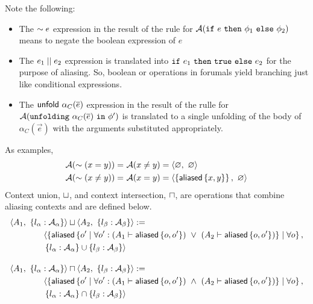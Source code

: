 %
Note the following:
\begin{itemize}
  \item The $\sim e$ expression in the result of the rule for $\mathcal{A}(\texttt{if} \ e \ \texttt{then} \ \phi_1 \ \texttt{else} \ \phi_2)$ means to negate the boolean expression of $e$
  \item The $e_1 \mid\mid e_2$ expression is translated into $\texttt{if} \ e_1 \ \texttt{then} \ \texttt{true} \ \texttt{else} \ e_2$ for the purpose of aliasing. So, boolean or operations in forumals yield branching just like conditional expressions.
  \item The $\textsf{unfold} \ \alpha_C(\overline{e})$ expression in the result of the rulle for $\mathcal{A}(\texttt{unfolding} \ \alpha_C(\overline{e}) \ \texttt{in} \ \phi^\prime)$ is translated to a single unfolding of the body of $\alpha_C(\vec{e})$ with the arguments substituted appropriately.
\end{itemize}
As examples,
\begin{align*}
  \mathcal{A}( \sim (x =   y) ) = & \ \mathcal{A}(x \neq y) = \langle \varnothing ,\ \varnothing \rangle \\
  \mathcal{A}( \sim (x\neq y) ) = & \ \mathcal{A}(x =    y) = \langle \left\{  \textsf{aliased}\left\{ x,y \right\}  \right\} ,\ \varnothing \rangle
\end{align*}
Context union, $\sqcup$, and context intersection, $\sqcap$, are operations that combine aliasing contexts and are defined below.
%
\begin{align*}
&
\context{A_1}{\set{ l_\alpha : \A_\alpha }} \contextunion
\context{A_2}{\set{ l_\beta : \A_\beta }} :=
\\ & \hspace{4em}
\langle
  \set{
    \aliased\set{
      o\p
      \mid
      \forall o\p :
      (A_1 \entails \aliased\set{o, o\p}) \ \lor \
      (A_2 \entails \aliased\set{o, o\p}) }
    \mid
    \forall o
  },
\\ & \hspace{4em}
  \set{ l_\alpha : \A_\alpha } \cup \set{ l_\beta : \A_\beta }
\rangle
%
\\[1em]
%
&
\context{A_1}{\set{ l_\alpha : \A_\alpha }} \contextintersection
\context{A_2}{\set{ l_\beta : \A_\beta }} :=
\\ & \hspace{4em}
\langle
  \set{
    \aliased\set{
      o\p
      \mid
      \forall o\p :
      (A_1 \entails \aliased\set{o, o\p}) \ \land \
      (A_2 \entails \aliased\set{o, o\p}) }
    \mid
    \forall o
  },
\\ & \hspace{4em}
  \set{ l_\alpha : \A_\alpha } \cap \set{ l_\beta : \A_\beta }
\rangle
\end{align*}

